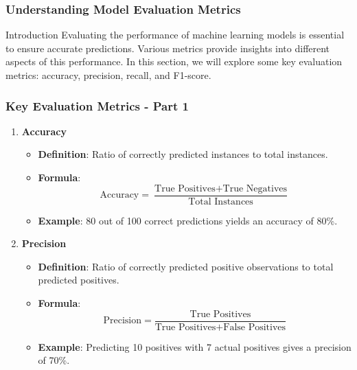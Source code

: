 \documentclass[aspectratio=169]{beamer}
\begin{document}
\begin{frame}[fragile]
    \frametitle{Understanding Model Evaluation Metrics}
    \begin{block}{Introduction}
        Evaluating the performance of machine learning models is essential to ensure accurate predictions. Various metrics provide insights into different aspects of this performance. In this section, we will explore some key evaluation metrics: accuracy, precision, recall, and F1-score.
    \end{block}
\end{frame}

\begin{frame}[fragile]
    \frametitle{Key Evaluation Metrics - Part 1}
    \begin{enumerate}
        \item \textbf{Accuracy}
        \begin{itemize}
            \item \textbf{Definition}: Ratio of correctly predicted instances to total instances.
            \item \textbf{Formula}:
            \begin{equation}
                \text{Accuracy} = \frac{\text{True Positives} + \text{True Negatives}}{\text{Total Instances}}
            \end{equation}
            \item \textbf{Example}: 80 out of 100 correct predictions yields an accuracy of 80\%.
        \end{itemize}
        
        \item \textbf{Precision}
        \begin{itemize}
            \item \textbf{Definition}: Ratio of correctly predicted positive observations to total predicted positives.
            \item \textbf{Formula}:
            \begin{equation}
                \text{Precision} = \frac{\text{True Positives}}{\text{True Positives} + \text{False Positives}}
            \end{equation}
            \item \textbf{Example}: Predicting 10 positives with 7 actual positives gives a precision of 70\%.
        \end{itemize}
    \end{enumerate}
\end{frame}
\end{document}

